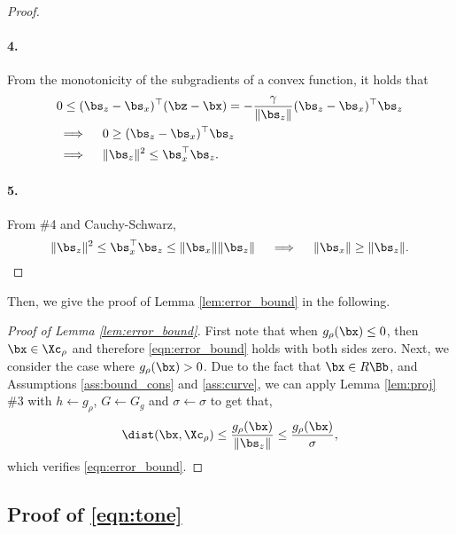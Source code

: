 \begin{proof}
    \paragraph{4.}
    From the monotonicity of the subgradients of a convex function, it holds that
    \begin{align*}
        & 0 \leq (\bs_z - \bs_x)^\top (\bz - \bx) = -\frac{\gamma}{\| \bs_z \|} (\bs_z - \bs_x)^\top \bs_z\\
        & \implies \quad 0 \geq (\bs_z - \bs_x)^\top \bs_z\\
        & \implies \quad \| \bs_z \|^2 \leq \bs_x^\top \bs_z.
    \end{align*}

    \paragraph{5.}
    From \#4 and Cauchy-Schwarz,
    \begin{equation*}
        \| \bs_z \|^2 \leq \bs_x^\top \bs_z \leq \| \bs_x \| \| \bs_z \| \quad \implies \quad \| \bs_x \| \geq \| \bs_z \|.
    \end{equation*}
\end{proof}

Then, we give the proof of Lemma \ref{lem:error_bound} in the following.

\begin{proof}[Proof of Lemma \ref{lem:error_bound}]
    First note that when $g_\rho (\bx) \leq 0$, then $\bx \in \Xc_\rho$ and therefore \eqref{eqn:error_bound} holds with both sides zero.
    Next, we consider the case where $g_\rho (\bx) > 0$.
    Due to the fact that $\bx \in R\Bb$, and Assumptions \ref{ass:bound_cons} and \ref{ass:curve}, we can apply Lemma \ref{lem:proj} \#3 with $h \leftarrow g_\rho$, $G \leftarrow G_g$ and $\sigma \leftarrow \sigma$ to get that,
    \begin{equation*}
        \dist(\bx, \Xc_\rho) \leq \frac{g_\rho(\bx)}{\| \bs_z \|} \leq \frac{g_\rho(\bx)}{\sigma},
    \end{equation*}
    which verifies \eqref{eqn:error_bound}.
\end{proof}


\subsection{Proof of \eqref{eqn:tone}}
\label{apx:tone}

